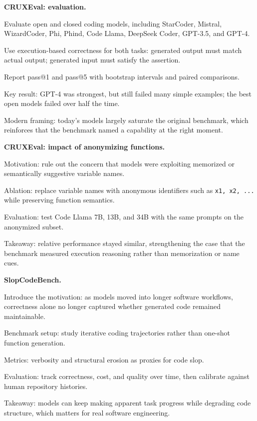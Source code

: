 \documentclass[10pt,twocolumn]{article}
\let\olditemize\itemize
\let\oldenditemize\enditemize
\renewenvironment{itemize}{\olditemize
  \setlength{\itemsep}{1pt}
  \setlength{\parskip}{0pt}
  \setlength{\parsep}{0pt}
  \setlength{\topsep}{2pt}
}{\oldenditemize}
\begin{document}
\textbf{CRUXEval: evaluation.}
\begin{itemize}
  \item Evaluate open and closed coding models, including StarCoder, Mistral, WizardCoder, Phi, Phind, Code Llama, DeepSeek Coder, GPT-3.5, and GPT-4.
  \item Use execution-based correctness for both tasks: generated output must match actual output; generated input must satisfy the assertion.
  \item Report pass@1 and pass@5 with bootstrap intervals and paired comparisons.
  \item Key result: GPT-4 was strongest, but still failed many simple examples; the best open models failed over half the time.
  \item Modern framing: today's models largely saturate the original benchmark, which reinforces that the benchmark named a capability at the right moment.
\end{itemize}

\textbf{CRUXEval: impact of anonymizing functions.}
\begin{itemize}
  \item Motivation: rule out the concern that models were exploiting memorized or semantically suggestive variable names.
  \item Ablation: replace variable names with anonymous identifiers such as \texttt{x1, x2, ...} while preserving function semantics.
  \item Evaluation: test Code Llama 7B, 13B, and 34B with the same prompts on the anonymized subset.
  \item Takeaway: relative performance stayed similar, strengthening the case that the benchmark measured execution reasoning rather than memorization or name cues.
\end{itemize}

\textbf{SlopCodeBench.}
\begin{itemize}
  \item Introduce the motivation: as models moved into longer software workflows, correctness alone no longer captured whether generated code remained maintainable.
  \item Benchmark setup: study iterative coding trajectories rather than one-shot function generation.
  \item Metrics: verbosity and structural erosion as proxies for code slop.
  \item Evaluation: track correctness, cost, and quality over time, then calibrate against human repository histories.
  \item Takeaway: models can keep making apparent task progress while degrading code structure, which matters for real software engineering.
\end{itemize}
\end{document}
